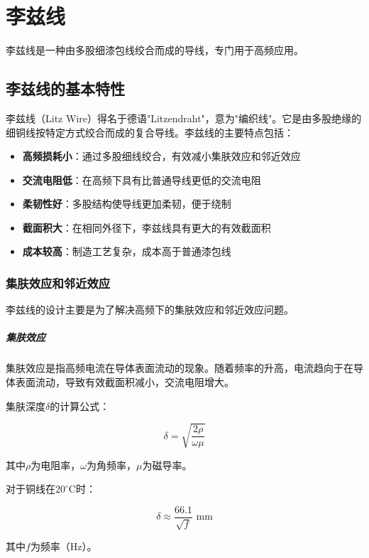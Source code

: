 \documentclass[12pt,UTF8]{ctexbook}
\begin{document}
\chapter{李兹线}

李兹线是一种由多股细漆包线绞合而成的导线，专门用于高频应用。

\section{李兹线的基本特性}

李兹线（Litz Wire）得名于德语"Litzendraht"，意为"编织线"。它是由多股绝缘的细铜线按特定方式绞合而成的复合导线。李兹线的主要特点包括：

\begin{itemize}[leftmargin=2cm]
    \item \textbf{高频损耗小}：通过多股细线绞合，有效减小集肤效应和邻近效应
    \item \textbf{交流电阻低}：在高频下具有比普通导线更低的交流电阻
    \item \textbf{柔韧性好}：多股结构使导线更加柔韧，便于绕制
    \item \textbf{截面积大}：在相同外径下，李兹线具有更大的有效截面积
    \item \textbf{成本较高}：制造工艺复杂，成本高于普通漆包线
\end{itemize}

\subsection{集肤效应和邻近效应}

李兹线的设计主要是为了解决高频下的集肤效应和邻近效应问题。

\paragraph{集肤效应}

集肤效应是指高频电流在导体表面流动的现象。随着频率的升高，电流趋向于在导体表面流动，导致有效截面积减小，交流电阻增大。

集肤深度$\delta$的计算公式：

$$ \delta = \sqrt{\frac{2\rho}{\omega\mu}} $$

其中$\rho$为电阻率，$\omega$为角频率，$\mu$为磁导率。

对于铜线在$20^\circ$C时：

$$ \delta \approx \frac{66.1}{\sqrt{f}} \text{ mm} $$

其中$f$为频率（Hz）。
\end{document}
